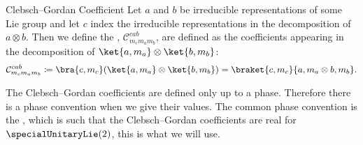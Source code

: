 \documentclass[fleqn]{NotesClass}
\newcommand*{\directproduct}{\otimes}
\newcommand*{\clebschgordan}[6]{\mathcal{C}_{#1#2#3}^{#4#5#6}}
\begin{document}
    \begin{dfn}{Clebsch--Gordan Coefficient}{}
        Let \(a\) and \(b\) be irreducible representations of some Lie group and let \(c\) index the irreducible representations in the decomposition of \(a \directproduct b\).
        Then we define the , \(\clebschgordan{m_c}{m_a}{m_b}{c}{a}{b}\), are defined as the coefficients appearing in the decomposition of \(\ket{a, m_a} \directproduct \ket{b, m_b}\):
        \begin{equation}
            \clebschgordan{m_c}{m_a}{m_b}{c}{a}{b} \coloneqq \bra{c, m_c} (\ket{a, m_a} \directproduct \ket{b, m_b}) = \braket{c, m_c}{a, m_a \directproduct b, m_b}.
        \end{equation}
    \end{dfn}
    \begin{wrn}
        The Clebsch--Gordan coefficients are defined only up to a phase.
        Therefore there is a phase convention when we give their values.
        The common phase convention is the , which is such that the Clebsch--Gordan coefficients are real for \(\specialUnitaryLie(2)\), this is what we will use.
    \end{wrn}
    
\end{document}
